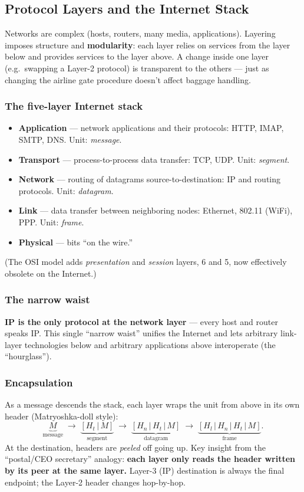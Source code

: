 \documentclass[hidelinks]{article}
\begin{document}
\subsection{Protocol Layers and the Internet Stack}

Networks are complex (hosts, routers, many media, applications). Layering
imposes structure and \textbf{modularity}: each layer relies on services from
the layer below and provides services to the layer above. A change inside one
layer (e.g.\ swapping a Layer-2 protocol) is transparent to the others ---
just as changing the airline gate procedure doesn't affect baggage handling.

\subsubsection{The five-layer Internet stack}
\begin{itemize}
    \item \textbf{Application} --- network applications and their protocols:
    HTTP, IMAP, SMTP, DNS. Unit: \emph{message}.
    \item \textbf{Transport} --- process-to-process data transfer:
    TCP, UDP. Unit: \emph{segment}.
    \item \textbf{Network} --- routing of datagrams source-to-destination:
    IP and routing protocols. Unit: \emph{datagram}.
    \item \textbf{Link} --- data transfer between neighboring nodes:
    Ethernet, 802.11 (WiFi), PPP. Unit: \emph{frame}.
    \item \textbf{Physical} --- bits ``on the wire.''
\end{itemize}
(The OSI model adds \emph{presentation} and \emph{session} layers, 6 and 5,
now effectively obsolete on the Internet.)

\subsubsection{The narrow waist}
\textbf{IP is the only protocol at the network layer} --- every host and
router speaks IP. This single ``narrow waist'' unifies the Internet and lets
arbitrary link-layer technologies below and arbitrary applications above
interoperate (the ``hourglass'').

\subsubsection{Encapsulation}
As a message descends the stack, each layer wraps the unit from above in its
own header (Matryoshka-doll style):
\[
    \underbrace{M}_{\text{message}}
    \;\to\; \underbrace{[H_t\,|\,M]}_{\text{segment}}
    \;\to\; \underbrace{[H_n\,|\,H_t\,|\,M]}_{\text{datagram}}
    \;\to\; \underbrace{[H_l\,|\,H_n\,|\,H_t\,|\,M]}_{\text{frame}}.
\]
At the destination, headers are \emph{peeled} off going up. Key insight from
the ``postal/CEO secretary'' analogy: \textbf{each layer only reads the header
written by its peer at the same layer.} Layer-3 (IP) destination is always the
final endpoint; the Layer-2 header changes hop-by-hop.
\end{document}
